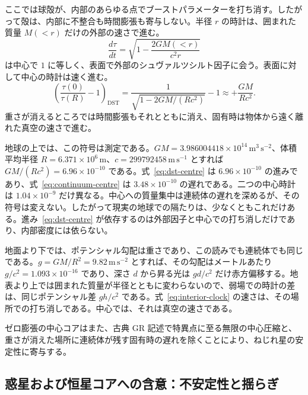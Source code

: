 \documentclass[a4paper]{article}
\begin{document}
ここでは球殻が、内部のあらゆる点でブーストパラメーターを打ち消す。したがって殻は、内部に不整合も時間膨張も寄与しない。半径 \(r\) の時計は、囲まれた質量 \(M(<r)\) だけの外部の速さで進む。
\begin{equation}
\label{eq:interior-clock}
\frac{d\tau}{dt}
=\sqrt{1-\frac{2GM(<r)}{c^{2}r}}
\end{equation}
は中心で \(1\) に等しく、表面で外部のシュヴァルツシルト因子に会う。表面に対して中心の時計は速く進む。
\begin{equation}
\label{eq:dst-centre}
\left(\frac{\tau(0)}{\tau(R)}-1\right)_{\mathrm{DST}}
=\frac{1}{\sqrt{1-2GM/(Rc^{2})}}-1
\approx +\frac{GM}{Rc^{2}}.
\end{equation}
重さが消えるところでは時間膨張もそれとともに消え、固有時は物体から遠く離れた真空の速さで進む。

地球の上では、この符号は測定である。\(GM=3.986004418\times 10^{14}\,\mathrm{m^{3}\,s^{-2}}\)、体積平均半径 \(R=6.371\times 10^{6}\,\mathrm{m}\)、\(c=299792458\,\mathrm{m\,s^{-1}}\) とすれば \(GM/(Rc^{2})=6.96\times 10^{-10}\) である。式~\eqref{eq:dst-centre} は \(6.96\times 10^{-10}\) の進みであり、式~\eqref{eq:continuum-centre} は \(3.48\times 10^{-10}\) の遅れである。二つの中心時計は \(1.04\times 10^{-9}\) だけ異なる。中心への質量集中は連続体の遅れを深めるが、その符号は変えない。したがって現実の地球での隔たりは、少なくともこれだけある。進み~\eqref{eq:dst-centre} が依存するのは外部因子と中心での打ち消しだけであり、内部密度には依らない。

地面より下では、ポテンシャル勾配は重さであり、この読みでも連続体でも同じである。\(g=GM/R^{2}=9.82\,\mathrm{m\,s^{-2}}\) とすれば、その勾配はメートルあたり \(g/c^{2}=1.093\times 10^{-16}\) であり、深さ \(d\) から昇る光は \(gd/c^{2}\) だけ赤方偏移する。地表より上では囲まれた質量が半径とともに変わらないので、弱場での時計の差は、同じポテンシャル差 \(gh/c^{2}\) である。式~\eqref{eq:interior-clock} の速さは、その場所での打ち消しである。中心では、それは真空の速さである。

ゼロ膨張の中心コアはまた、古典 GR 記述で特異点に至る無限の中心圧縮と、重さが消えた場所に連続体が残す固有時の遅れを除くことにより、ねじれ星の安定性に寄与する。

\subsection{惑星および恒星コアへの含意：不安定性と揺らぎ}
\end{document}
